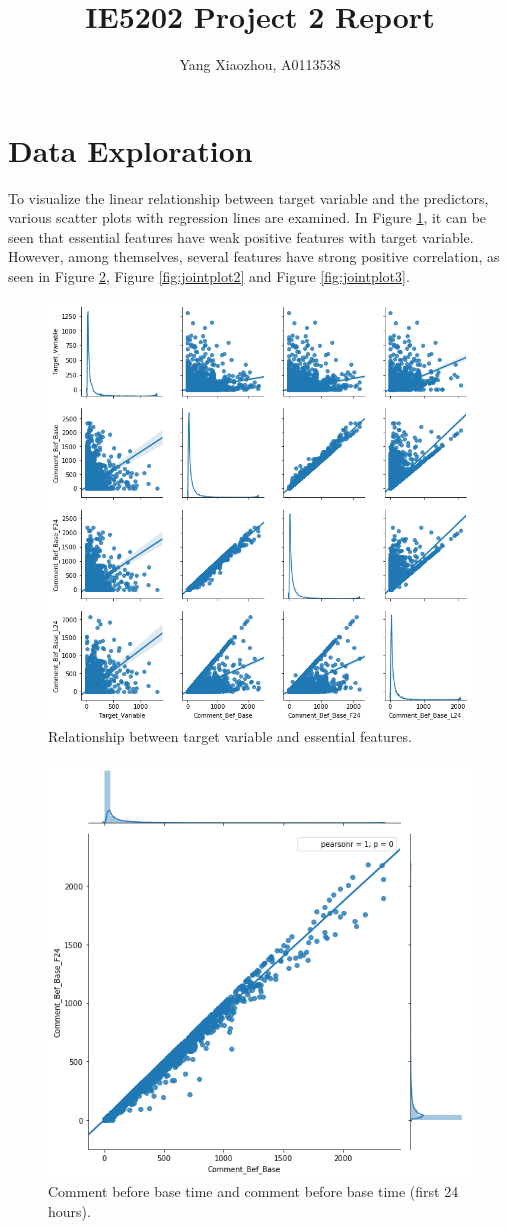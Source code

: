 \documentclass[]{article}
\title{IE5202 Project 2 Report}
\author{Yang Xiaozhou, A0113538}
\begin{document}
\maketitle

\section{Data Exploration}

To visualize the linear relationship between target variable and the predictors, various scatter plots with regression lines are examined. In Figure \ref{fig:pairplot1}, it can be seen that essential features have weak positive features with target variable. However, among themselves, several features have strong positive correlation, as seen in Figure \ref{fig:jointplot1}, Figure \ref{fig:jointplot2} and Figure \ref{fig:jointplot3}.
%
\begin{figure}[hbtp]
	\centering
	\includegraphics[width=0.6\columnwidth]{../Figures/pairplot1}
	\caption{Relationship between target variable and essential features.}
	\label{fig:pairplot1}
\end{figure}
%
%
\begin{figure}[hbtp]
	\centering
	\includegraphics[width=.5\columnwidth]{../Figures/jointplot1}
	\caption{Comment before base time and comment before base time (first 24 hours).}
	\label{fig:jointplot1}
\end{figure}
\end{document}
